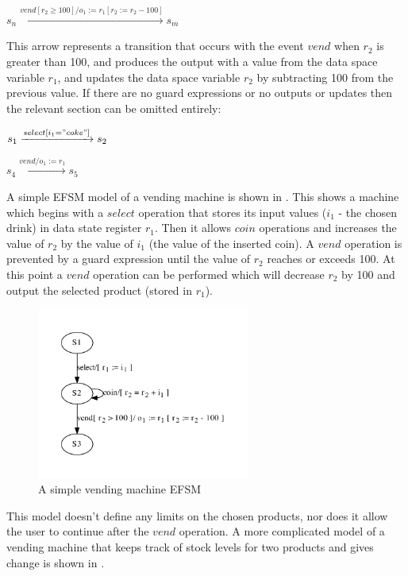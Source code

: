 \begin{center}
$s_n \xrightarrow{vend[r_{2} \geq 100]/o_{1} :=r_{1}[r_{2} := r_{2} - 100]} s_m$
\end{center}

This arrow represents a transition that occurs with the event $vend$ when $r_2$ is greater than 100, and produces the output with a value from the data space variable $r_1$, and updates the data space variable $r_2$ by subtracting 100 from the previous value. If there are no guard expressions or no outputs or updates then the relevant section can be omitted entirely:

\begin{center}
$s_1 \xrightarrow{select[i_{1}="coke"]} s_2$

$s_4 \xrightarrow{vend/o_{1} := r_{1}} s_5$
\end{center}

A simple EFSM model of a vending machine is shown in . This shows a machine which begins with a $select$ operation that stores its input values ($i_1$ - the chosen drink) in data state register $r_1$. Then it allows $coin$ operations and increases the value of $r_2$ by the value of $i_1$ (the value of the inserted coin). A $vend$ operation is prevented by a guard expression until the value of $r_2$ reaches or exceeds 100. At this point a $vend$ operation can be performed which will decrease $r_2$ by 100 and output the selected product (stored in $r_1$).

\begin{figure}[h]
\begin{center}
\includegraphics[width=7cm]{figures/efsm/vend-real.pdf}
\caption{A simple vending machine EFSM}
\label{fig:vendsimple}
\end{center}
\end{figure}

This model doesn't define any limits on the chosen products, nor does it allow the user to continue after the $vend$ operation. A more complicated model of a vending machine that keeps track of stock levels for two products and gives change is shown in .

